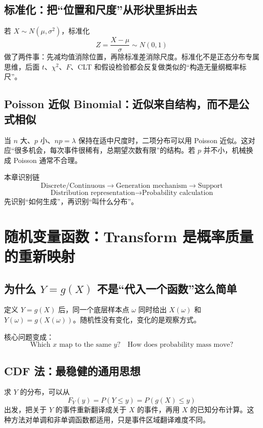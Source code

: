 \documentclass[11pt,a4paper,openany]{ctexbook}
\begin{document}
\section{标准化：把“位置和尺度”从形状里拆出去}
若 $X\sim N(\mu,\sigma^2)$，标准化
\[
Z=\frac{X-\mu}{\sigma}\sim N(0,1)
\]
做了两件事：先减均值消除位置，再除标准差消除尺度。标准化不是正态分布专属思维，后面 $t$、$\chi^2$、$F$、CLT 和假设检验都会反复做类似的“构造无量纲概率标尺”。

\section{Poisson 近似 Binomial：近似来自结构，而不是公式相似}
当 $n$ 大、$p$ 小、$np=\lambda$ 保持在适中尺度时，二项分布可以用 Poisson 近似。这对应“很多机会，每次事件很稀有，总期望次数有限”的结构。若 $p$ 并不小，机械换成 Poisson 通常不合理。

\begin{methodbox}{本章识别链}
\[
\boxed{\text{Discrete/Continuous}\to\text{Generation mechanism}\to\text{Support}}
\]
\[
\boxed{\text{Distribution representation}\to\text{Probability calculation}}
\]
先识别“如何生成”，再识别“叫什么分布”。
\end{methodbox}

\chapter{随机变量函数：Transform 是概率质量的重新映射}

\section{为什么 \texorpdfstring{$Y=g(X)$}{Y=g(X)} 不是“代入一个函数”这么简单}
定义 $Y=g(X)$ 后，同一个底层样本点 $\omega$ 同时给出 $X(\omega)$ 和 $Y(\omega)=g(X(\omega))$。随机性没有变化，变化的是观察方式。

核心问题变成：
\[
\boxed{\text{Which }x\text{ map to the same }y?\quad\text{How does probability mass move?}}
\]

\section{CDF 法：最稳健的通用思想}
求 $Y$ 的分布，可以从
\[
F_Y(y)=P(Y\le y)=P(g(X)\le y)
\]
出发，把关于 $Y$ 的事件重新翻译成关于 $X$ 的事件，再用 $X$ 的已知分布计算。这种方法对单调和非单调函数都适用，只是事件区域翻译难度不同。
\end{document}
